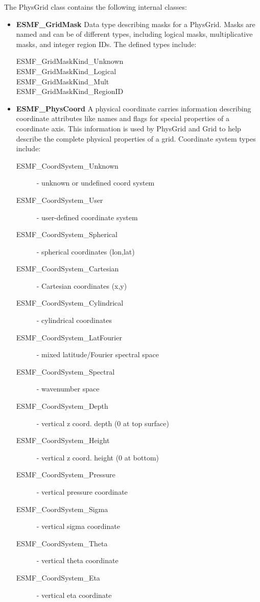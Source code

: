 The PhysGrid class contains the following internal classes:
\begin{itemize}
\item {\bf ESMF\_GridMask} Data type describing masks for a PhysGrid.  Masks
are named and can be of different types, including logical masks,
multiplicative masks, and integer region IDs.  The defined types include:
\begin{description}
   \item[ESMF\_GridMaskKind\_Unknown]
   \item[ESMF\_GridMaskKind\_Logical]
   \item[ESMF\_GridMaskKind\_Mult]
   \item[ESMF\_GridMaskKind\_RegionID]
\end{description}
\item {\bf ESMF\_PhysCoord} A physical coordinate carries information describing
coordinate attributes like names and flags for special properties of a
coordinate axis.  This information is used by PhysGrid and Grid to help
describe the complete physical properties of a grid.  Coordinate system
types include:
\begin{description}
   \item[ESMF\_CoordSystem\_Unknown] - unknown or undefined coord system
   \item[ESMF\_CoordSystem\_User] - user-defined coordinate system
   \item[ESMF\_CoordSystem\_Spherical] - spherical coordinates (lon,lat)
   \item[ESMF\_CoordSystem\_Cartesian] - Cartesian coordinates (x,y)
   \item[ESMF\_CoordSystem\_Cylindrical] - cylindrical coordinates
   \item[ESMF\_CoordSystem\_LatFourier] - mixed latitude/Fourier spectral space
   \item[ESMF\_CoordSystem\_Spectral] - wavenumber space
   \item[ESMF\_CoordSystem\_Depth] - vertical z coord. depth (0 at top surface)
   \item[ESMF\_CoordSystem\_Height] - vertical z coord. height (0 at bottom)
   \item[ESMF\_CoordSystem\_Pressure] - vertical pressure coordinate
   \item[ESMF\_CoordSystem\_Sigma] - vertical sigma coordinate
   \item[ESMF\_CoordSystem\_Theta] - vertical theta coordinate
   \item[ESMF\_CoordSystem\_Eta] - vertical eta coordinate

\end{description}
\end{itemize}
